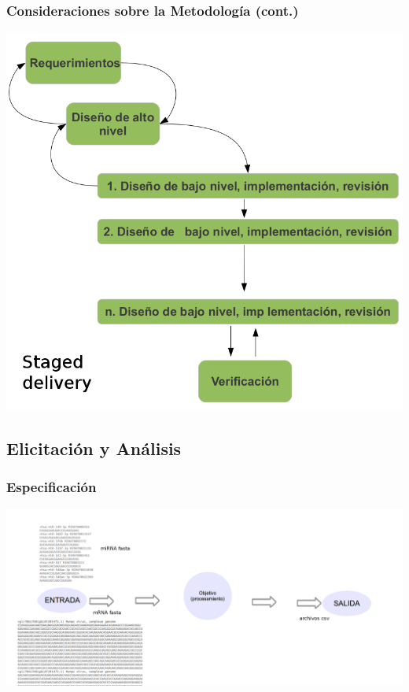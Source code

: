       \begin{frame}\frametitle{\textbf{Consideraciones sobre la Metodología (cont.)}}        
          \begin{center}
            \includegraphics[scale=.35]{images/stagedDelivery2.png}
          \end{center}        
      \end{frame}  

  \subsection{Elicitación y Análisis}
      \begin{frame}\frametitle{\textbf{Especificación}}
        \hspace*{-1cm} \includegraphics[scale=.19]{images/especificacion1.png}
      \end{frame}  

